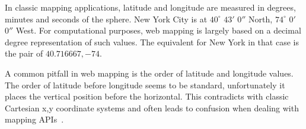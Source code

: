 In classic mapping applications, latitude and longitude are measured in degrees, minutes and seconds of the sphere. New York City is at $40^\circ$ $43'$ $0''$ North, $74^\circ$ $0'$ $0''$ West. For computational purposes, web mapping is largely based on a decimal degree representation of such values. The equivalent for New York in that case is the pair of $40.716667, -74$.

A common pitfall in web mapping is the order of latitude and longitude values. The order of latitude before longitude seems to be standard, unfortunately it places the vertical position before the horizontal. This contradicts with classic Cartesian x,y coordinate systems and often leads to confusion when dealing with mapping APIs~\cite{Zzolo11mappingdrupal}. 






















